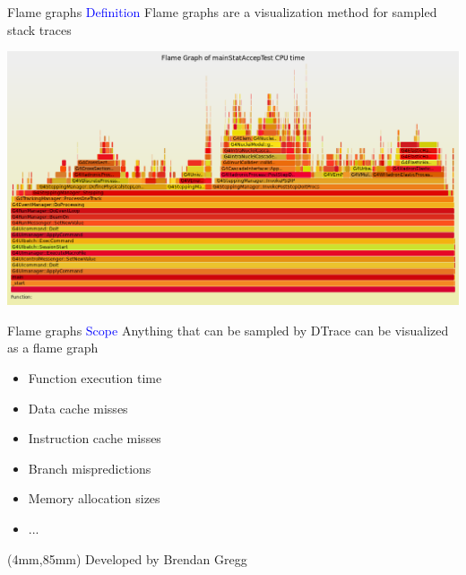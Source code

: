 \documentclass{beamer}
\newenvironment{reference}[2]{%
  \begin{textblock*}{\textwidth}(#1,#2) 
      \tiny\bgroup\color{red!50!black}}{\egroup\end{textblock*}}
\begin{document}
\begin{frame}{Flame graphs}
\textcolor{blue}{Definition} Flame graphs are a visualization method for sampled stack traces

\begin{center}
  \includegraphics[width=1.0\textwidth]{timeflame.png}
\end{center}
\end{frame}

\begin{frame}{Flame graphs}
\textcolor{blue}{Scope} Anything that can be sampled by DTrace can be visualized as a flame graph
\begin{itemize}
\item Function execution time
\item Data cache misses
\item Instruction cache misses
\item Branch mispredictions
\item Memory allocation sizes
\item ...
\end{itemize}

\begin{reference}{4mm}{85mm}
Developed by Brendan Gregg
\end{reference}
\end{frame}
\end{document}
